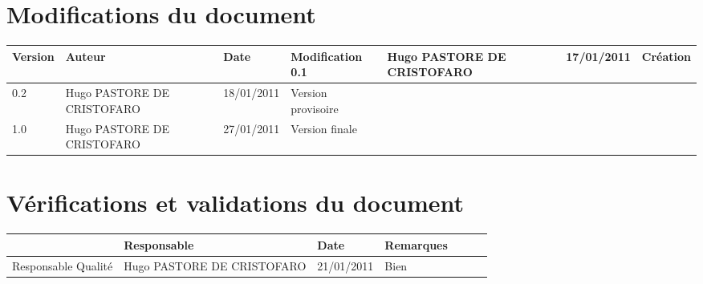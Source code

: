 
\section*{Modifications du document}

\begin{center}
\begin{longtable}{|m{14mm}||m{36mm}|m{36mm}|m{60mm}|}
\hline
Version & Auteur & Date & Modification\endhead \hline
0.1
& %
Hugo PASTORE DE CRISTOFARO
& %
17/01/2011
& %
Création
\\\hline
0.2
& %
Hugo PASTORE DE CRISTOFARO
& %
18/01/2011
& %
Version provisoire
\\\hline
1.0
& %
Hugo PASTORE DE CRISTOFARO
& %
27/01/2011
& %
Version finale
\\\hline
\end{longtable}
\end{center}


\section*{Vérifications et validations du document}

\begin{center}
\begin{longtable}{|m{15mm}|m{36mm}|m{36mm}|m{60mm}|}
\hline
 & Responsable & Date & Remarques\endhead \hline

& %

& %

& %

\\\hline
Responsable Qualité
& %
Hugo PASTORE DE CRISTOFARO
& %
21/01/2011
& %
Bien
\\\hline
\end{longtable}
\end{center}

\pagebreak

